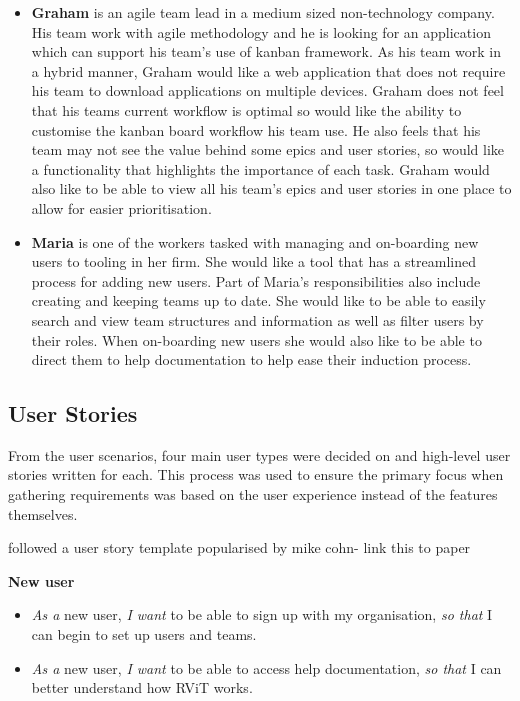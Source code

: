 \documentclass[l4proj.tex]{subfiles}
\begin{document}
\begin{itemize}
    \item \textbf{Graham} is an agile team lead in a medium sized non-technology company. His team work with agile methodology and he is looking for an application which can support his team's use of kanban framework. As his team work in a hybrid manner, Graham would like a web application that does not require his team to download applications on multiple devices. Graham does not feel that his teams current workflow is optimal so would like the ability to customise the kanban board workflow his team use. He also feels that his team may not see the value behind some epics and user stories, so would like a functionality that highlights the importance of each task. Graham would also like to be able to view all his team's epics and user stories in one place to allow for easier prioritisation. \\

    \item \textbf{Maria} is one of the workers tasked with managing and on-boarding new users to tooling in her firm. She would like a tool that has a streamlined process for adding new users. Part of Maria's responsibilities also include creating and keeping teams up to date. She would like to be able to easily search and view team structures and information as well as filter users by their roles. When on-boarding new users she would also like to be able to direct them to help documentation to help ease their induction process. 
\end{itemize}

\subsection{User Stories}
From the user scenarios, four main user types were decided on and high-level user stories written for each. This process was used to ensure the primary focus when gathering requirements was based on the user experience instead of the features themselves. 

followed a user story template popularised by mike cohn- link this to paper

\textbf{New user}
\begin{itemize}
    \item \textit{As a} new user, \textit{I want} to be able to sign up with my organisation, \textit{so that} I can begin to set up users and teams.
    \item \textit{As a} new user, \textit{I want} to be able to access help documentation, \textit{so that} I can better understand how RViT works.
\end{itemize}
\end{document}
